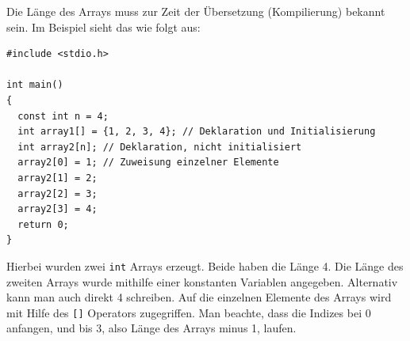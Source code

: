 Die Länge des Arrays muss zur Zeit der Übersetzung (Kompilierung) bekannt sein.
Im Beispiel sieht das wie folgt aus:
\begin{lstlisting}
#include <stdio.h>

int main()
{
  const int n = 4;
  int array1[] = {1, 2, 3, 4}; // Deklaration und Initialisierung
  int array2[n]; // Deklaration, nicht initialisiert
  array2[0] = 1; // Zuweisung einzelner Elemente
  array2[1] = 2;
  array2[2] = 3;
  array2[3] = 4;
  return 0;
}
\end{lstlisting}
Hierbei wurden zwei \texttt{int} Arrays erzeugt.
Beide haben die Länge 4.
Die Länge des zweiten Arrays wurde mithilfe einer konstanten Variablen angegeben.
Alternativ kann man auch direkt 4 schreiben.
Auf die einzelnen Elemente des Arrays wird mit Hilfe des \verb|[]| Operators zugegriffen.
Man beachte, dass die Indizes bei $0$ anfangen, und bis $3$, also Länge des Arrays minus 1, laufen.

